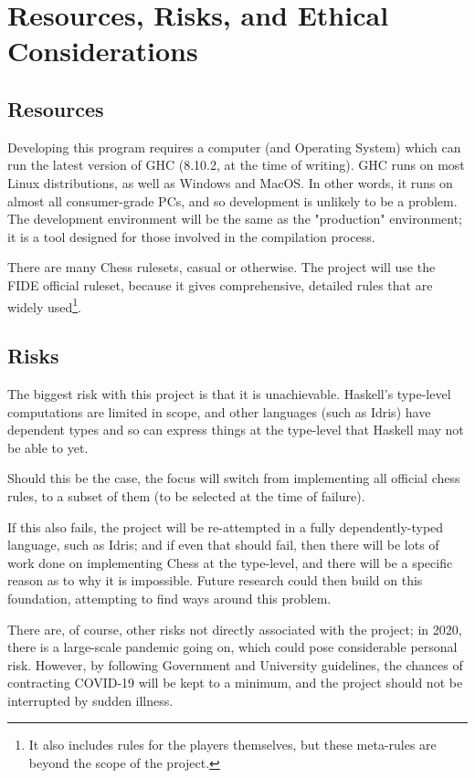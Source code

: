 \documentclass[12pt, a4paper]{scrartcl}
\begin{document}
\section{Resources, Risks, and Ethical Considerations}

\subsection{Resources}

Developing this program requires a computer (and Operating System) which can run the latest version of GHC (8.10.2, at the time of writing). GHC runs on most Linux distributions, as well as Windows and MacOS. In other words, it runs on almost all consumer-grade PCs, and so development is unlikely to be a problem. The development environment will be the same as the "production" environment; it is a tool designed for those involved in the compilation process.

There are many Chess rulesets, casual or otherwise. The project will use the FIDE official ruleset, because it gives comprehensive, detailed rules that are widely used\footnote{It also includes rules for the players themselves, but these meta-rules are beyond the scope of the project.}.

\subsection{Risks}

The biggest risk with this project is that it is unachievable. Haskell's type-level computations are limited in scope, and other languages (such as Idris) have dependent types and so can express things at the type-level that Haskell may not be able to yet.

Should this be the case, the focus will switch from implementing all official chess rules, to a subset of them (to be selected at the time of failure).

If this also fails, the project will be re-attempted in a fully dependently-typed language, such as Idris; and if even that should fail, then there will be lots of work done on implementing Chess at the type-level, and there will be a specific reason as to why it is impossible. Future research could then build on this foundation, attempting to find ways around this problem.

There are, of course, other risks not directly associated with the project; in 2020, there is a large-scale pandemic going on, which could pose considerable personal risk. However, by following Government and University guidelines, the chances of contracting COVID-19 will be kept to a minimum, and the project should not be interrupted by sudden illness.
\end{document}
